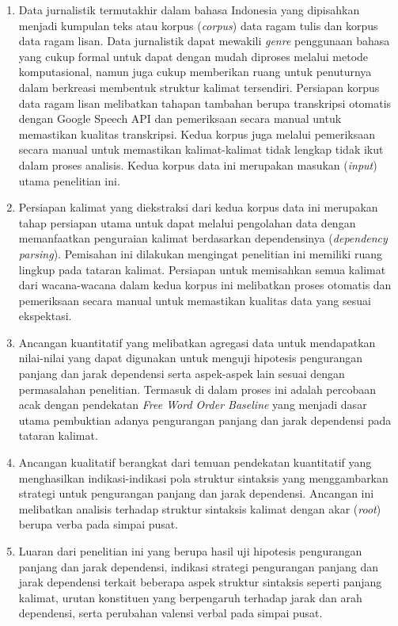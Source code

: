 \begin{enumerate}
	\item Data jurnalistik termutakhir dalam bahasa Indonesia yang dipisahkan menjadi kumpulan teks atau korpus (\textit{corpus}) data ragam tulis dan korpus data ragam lisan. Data jurnalistik dapat mewakili \textit{genre} penggunaan bahasa yang cukup formal untuk dapat dengan mudah diproses melalui metode komputasional, namun juga cukup memberikan ruang untuk penuturnya dalam berkreasi membentuk struktur kalimat tersendiri. Persiapan korpus data ragam lisan melibatkan tahapan tambahan berupa transkripsi otomatis dengan Google Speech API dan pemeriksaan secara manual untuk memastikan kualitas transkripsi. Kedua korpus juga melalui pemeriksaan secara manual untuk memastikan kalimat-kalimat tidak lengkap tidak ikut dalam proses analisis. Kedua korpus data ini merupakan masukan (\textit{input}) utama penelitian ini.
	\item Persiapan kalimat yang diekstraksi dari kedua korpus data ini merupakan tahap persiapan utama untuk dapat melalui pengolahan data dengan memanfaatkan penguraian kalimat berdasarkan dependensinya (\textit{dependency parsing}). Pemisahan ini dilakukan mengingat penelitian ini memiliki ruang lingkup pada tataran kalimat. Persiapan untuk memisahkan semua kalimat dari wacana-wacana dalam kedua korpus ini melibatkan proses otomatis dan pemeriksaan secara manual untuk memastikan kualitas data yang sesuai ekspektasi. 
	\item Ancangan kuantitatif yang melibatkan agregasi data untuk mendapatkan nilai-nilai yang dapat digunakan untuk menguji hipotesis pengurangan panjang dan jarak dependensi serta aspek-aspek lain sesuai dengan permasalahan penelitian. Termasuk di dalam proses ini adalah percobaan acak dengan pendekatan \textit{Free Word Order Baseline} yang menjadi dasar utama pembuktian adanya pengurangan panjang dan jarak dependensi pada tataran kalimat.
	\item Ancangan kualitatif berangkat dari temuan pendekatan kuantitatif yang menghasilkan indikasi-indikasi pola struktur sintaksis yang menggambarkan strategi untuk pengurangan panjang dan jarak dependensi. Ancangan ini melibatkan analisis terhadap struktur sintaksis kalimat dengan akar (\textit{root}) berupa verba pada simpai pusat. 
	\item Luaran dari penelitian ini yang berupa hasil uji hipotesis pengurangan panjang dan jarak dependensi, indikasi strategi pengurangan panjang dan jarak dependensi terkait beberapa aspek struktur sintaksis seperti panjang kalimat, urutan konstituen yang berpengaruh terhadap jarak dan arah dependensi, serta perubahan valensi verbal pada simpai pusat.
\end{enumerate}


